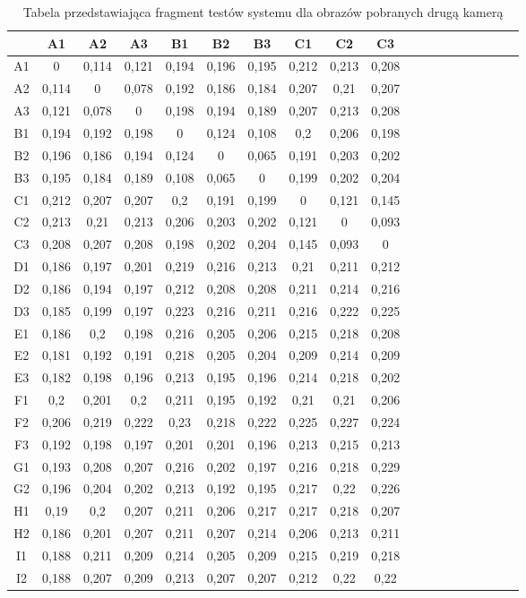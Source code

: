 \begin{table}
\caption{Tabela przedstawiająca fragment testów systemu dla obrazów pobranych drugą kamerą}
\label{tab:druga1}
\begin{tabular}{|c|c|c|c|c|c|c|c|c|c|c|c|c|c|c|c|c|c|c|}
\hline
 & A1 & A2 & A3 & B1 & B2 & B3 & C1 & C2 & C3 \\ \hline
A1 & 0&0,114&0,121&0,194&0,196&0,195&0,212&0,213&0,208\\ \hline
A2 & 0,114&0&0,078&0,192&0,186&0,184&0,207&0,21&0,207\\ \hline
A3 & 0,121&0,078&0&0,198&0,194&0,189&0,207&0,213&0,208\\ \hline
B1 & 0,194&0,192&0,198&0&0,124&0,108&0,2&0,206&0,198\\ \hline
B2 & 0,196&0,186&0,194&0,124&0&0,065&0,191&0,203&0,202\\ \hline
B3 & 0,195&0,184&0,189&0,108&0,065&0&0,199&0,202&0,204\\ \hline
C1 & 0,212&0,207&0,207&0,2&0,191&0,199&0&0,121&0,145\\ \hline
C2 & 0,213&0,21&0,213&0,206&0,203&0,202&0,121&0&0,093\\ \hline
C3 & 0,208&0,207&0,208&0,198&0,202&0,204&0,145&0,093&0\\ \hline
D1 & 0,186&0,197&0,201&0,219&0,216&0,213&0,21&0,211&0,212\\ \hline
D2 & 0,186&0,194&0,197&0,212&0,208&0,208&0,211&0,214&0,216\\ \hline
D3 & 0,185&0,199&0,197&0,223&0,216&0,211&0,216&0,222&0,225\\ \hline
E1 & 0,186&0,2&0,198&0,216&0,205&0,206&0,215&0,218&0,208\\ \hline
E2 & 0,181&0,192&0,191&0,218&0,205&0,204&0,209&0,214&0,209\\ \hline
E3 & 0,182&0,198&0,196&0,213&0,195&0,196&0,214&0,218&0,202\\ \hline
F1 & 0,2&0,201&0,2&0,211&0,195&0,192&0,21&0,21&0,206\\ \hline
F2 & 0,206&0,219&0,222&0,23&0,218&0,222&0,225&0,227&0,224\\ \hline
F3 & 0,192&0,198&0,197&0,201&0,201&0,196&0,213&0,215&0,213\\ \hline
G1 & 0,193&0,208&0,207&0,216&0,202&0,197&0,216&0,218&0,229 \\ \hline
G2 & 0,196&0,204&0,202&0,213&0,192&0,195&0,217&0,22&0,226 \\ \hline
H1 & 0,19&0,2&0,207&0,211&0,206&0,217&0,217&0,218&0,207 \\ \hline
H2 & 0,186&0,201&0,207&0,211&0,207&0,214&0,206&0,213&0,211 \\ \hline
I1 & 0,188&0,211&0,209&0,214&0,205&0,209&0,215&0,219&0,218 \\ \hline
I2 & 0,188&0,207&0,209&0,213&0,207&0,207&0,212&0,22&0,22 \\ \hline
\end{tabular}
\end{table}


